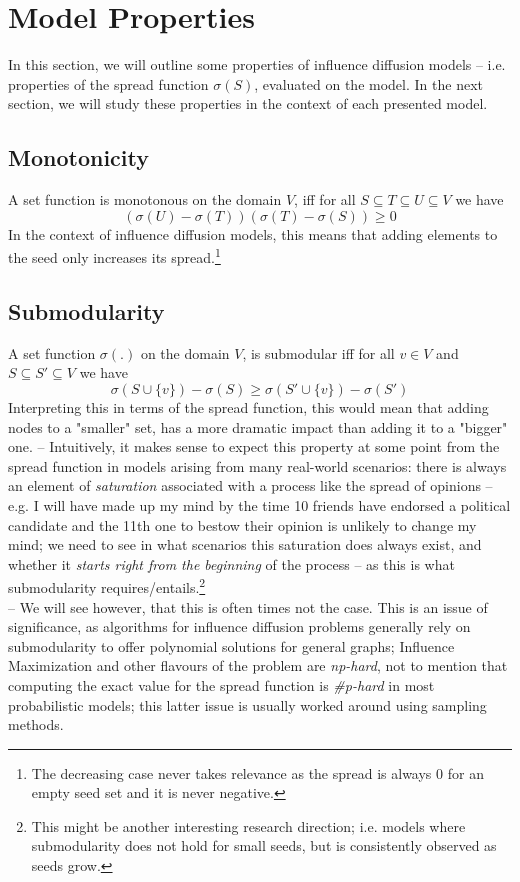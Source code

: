 \documentclass[twocolumn, 10pt]{article}
\begin{document}
\section{Model Properties}
In this section, we will outline some properties of influence diffusion models -- i.e. properties of the spread function $\sigma(S)$, evaluated on the model. In the next section, we will study these properties in the context of each presented model. 
\subsection{Monotonicity}
A set function is monotonous on the domain $V$, iff for all $S \subseteq T \subseteq U \subseteq V$ we have
$$
(\sigma(U) - \sigma(T))(\sigma(T) - \sigma(S)) \geq 0
$$
In the context of influence diffusion models, this means that adding elements to the seed only increases its spread.\footnote{The decreasing case never takes relevance as the spread is always 0 for an empty seed set and it is never negative.}
\subsection{Submodularity}
A set function $\sigma(.)$ on the domain $V$, is submodular iff for all $v \in V$ and $S \subseteq S' \subseteq V$ we have
$$
\sigma(S \cup \{v\}) - \sigma(S) \geq \sigma(S' \cup \{v\}) - \sigma(S')
$$
Interpreting this in terms of the spread function, this would mean that adding nodes to a "smaller" set, has a more dramatic impact than adding it to a "bigger" one. -- Intuitively, it makes sense to expect this property at some point from the spread function in models arising from many real-world scenarios: there is always an element of \textit{saturation} associated with a process like the spread of opinions -- e.g. I will have made up my mind by the time 10 friends have endorsed a political candidate and the 11th one to bestow their opinion is unlikely to change my mind; we need to see in what scenarios this saturation does always exist, and whether it \textit{starts right from the beginning} of the process -- as this is what submodularity requires/entails.\footnote{This might be another interesting research direction; i.e. models where submodularity does not hold for small seeds, but is consistently observed as seeds grow.}\\
-- We will see however, that this is often times not the case. This is an issue of significance, as algorithms for influence diffusion problems generally rely on submodularity to offer polynomial solutions for general graphs; Influence Maximization and other flavours of the problem are \textit{np-hard}, not to mention that computing the exact value for the spread function is \textit{\#p-hard} in most probabilistic models; this latter issue is usually worked around using sampling methods.
\end{document}

